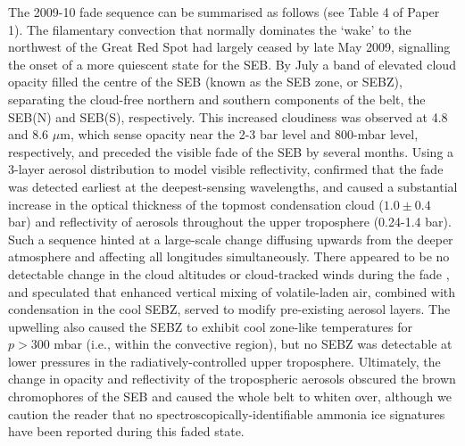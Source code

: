 \documentclass[final,authoryear,5p,times,twocolumn]{elsarticle}
\begin{document}
The 2009-10 fade sequence can be summarised as follows (see Table 4 of Paper 1).  The filamentary convection that normally dominates the `wake' to the northwest of the Great Red Spot had largely ceased by late May 2009, signalling the onset of a more quiescent state for the SEB.  By July a band of elevated cloud opacity filled the centre of the SEB (known as the SEB zone, or SEBZ), separating the cloud-free northern and southern components of the belt, the SEB(N) and SEB(S), respectively.  This increased cloudiness was observed at 4.8 and 8.6 $\mu$m, which sense opacity near the 2-3 bar level and 800-mbar level, respectively, and preceded the visible fade of the SEB by several months.  Using a 3-layer aerosol distribution to model visible reflectivity, \citet{12perezhoyos} confirmed that the fade was detected earliest at the deepest-sensing wavelengths, and caused a substantial increase in the optical thickness of the topmost condensation cloud ($1.0\pm0.4$ bar) and reflectivity of aerosols throughout the upper troposphere (0.24-1.4 bar).  Such a sequence hinted at a large-scale change diffusing upwards from the deeper atmosphere and affecting all longitudes simultaneously.  There appeared to be no detectable change in the cloud altitudes or cloud-tracked winds during the fade \citep{12perezhoyos}, and \citet{11fletcher_fade} speculated that enhanced vertical mixing of volatile-laden air, combined with condensation in the cool SEBZ, served to modify pre-existing aerosol layers.  The upwelling also caused the SEBZ to exhibit cool zone-like temperatures for $p>300$ mbar (i.e., within the convective region), but no SEBZ was detectable at lower pressures in the radiatively-controlled upper troposphere.  Ultimately, the change in opacity and reflectivity of the tropospheric aerosols obscured the brown chromophores of the SEB and caused the whole belt to whiten over, although we caution the reader that no spectroscopically-identifiable ammonia ice signatures \citep{02baines} have been reported during this faded state.  
\end{document}
